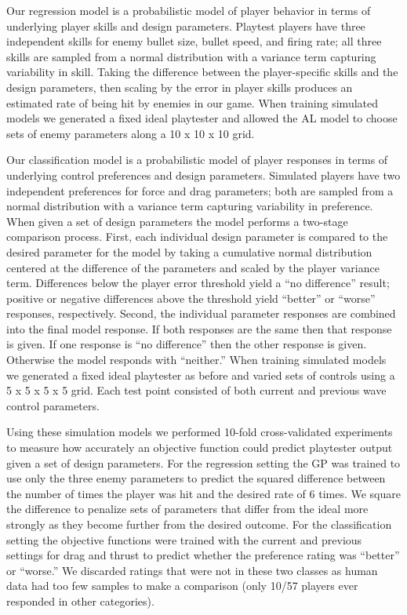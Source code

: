 \documentclass{sig-alternate}
\begin{document}
Our regression model is a probabilistic model of player behavior in terms of underlying player skills and design parameters.
Playtest players have three independent skills for enemy bullet size, bullet speed, and firing rate; all three skills are sampled from a normal distribution with a variance term capturing variability in skill.
Taking the difference between the player-specific skills and the design parameters, then scaling by the error in player skills produces an estimated rate of being hit by enemies in our game.
When training simulated models we generated a fixed ideal playtester and allowed the AL model to choose sets of enemy parameters along a 10 x 10 x 10 grid.



Our classification model is a probabilistic model of player responses in terms of underlying control preferences and design parameters.
Simulated players have two independent preferences for force and drag parameters; both are sampled from a normal distribution with a variance term capturing variability in preference.
When given a set of design parameters the model performs a two-stage comparison process.
First, each individual design parameter is compared to the desired parameter for the model by taking a cumulative normal distribution centered at the difference of the parameters and scaled by the player variance term.
Differences below the player error threshold yield a ``no difference'' result; positive or negative differences above the threshold yield ``better'' or ``worse'' responses, respectively.
Second, the individual parameter responses are combined into the final model response.
If both responses are the same then that response is given.
If one response is ``no difference'' then the other response is given.
Otherwise the model responds with ``neither.''
When training simulated models we generated a fixed ideal playtester as before and varied sets of controls using a 5 x 5 x 5 x 5 grid.
Each test point consisted of both current and previous wave control parameters.



Using these simulation models we performed 10-fold cross-validated experiments to measure how accurately an objective function could predict playtester output given a set of design parameters.
For the regression setting the GP was trained to use only the three enemy parameters to predict the squared difference between the number of times the player was hit and the desired rate of 6 times.
We square the difference to penalize sets of parameters that differ from the ideal more strongly as they become further from the desired outcome.
For the classification setting the objective functions were trained with the current and previous settings for drag and thrust to predict whether the preference rating was ``better'' or ``worse.''
We discarded ratings that were not in these two classes as human data had too few samples to make a comparison (only 10/57 players ever responded in other categories).
\end{document}
